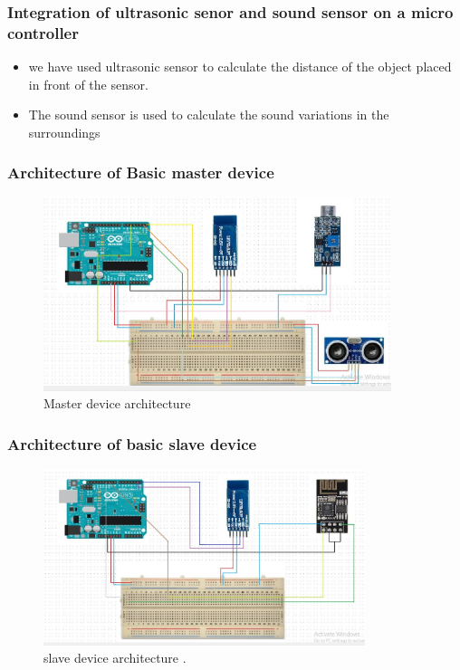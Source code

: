 \documentclass{beamer}
\begin{document}
\begin{frame}\frametitle{Integration of ultrasonic senor and sound sensor on a micro controller}
\begin{itemize}
\item we have used ultrasonic sensor to calculate the distance of the object placed in front of the sensor.
\item The sound sensor is used to calculate the  sound variations in the  surroundings
\end{itemize}
\end{frame}
\begin{frame}\frametitle{Architecture of Basic master device}
\begin{itemize}
  \begin{figure}[H]
  \centerline{\includegraphics[width=4.0in]{master.JPG}}
  \caption{ \textbf{}Master device architecture}
  \end{figure}
\end{itemize}
\end{frame}
\begin{frame}\frametitle{Architecture of basic slave device }
\begin{itemize}
\begin{figure}[h]
\centerline{\includegraphics[width=3.7in]{slave}}
\caption{slave device architecture  .}
\end{figure}
\end{itemize}
\end{frame}
\end{document}
